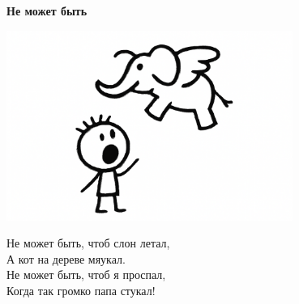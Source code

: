 \vspace*{\fill}
\begin{center}
  {\huge\textbf{Не может быть}}

  \vspace{1.5em}
  \includegraphics[width=0.7\textwidth]{pictures/nemozhebit.png}
  \vspace{4em}
  \parbox{0.6\textwidth}{
    \LARGE
    \begin{spacing}{1.2}
      Не может быть, чтоб слон летал,\\
      А кот на дереве мяукал.\\
      Не может быть, чтоб я проспал,\\
      Когда так громко папа стукал! %
    \end{spacing}
      
  }
\end{center}
\vspace*{\fill}